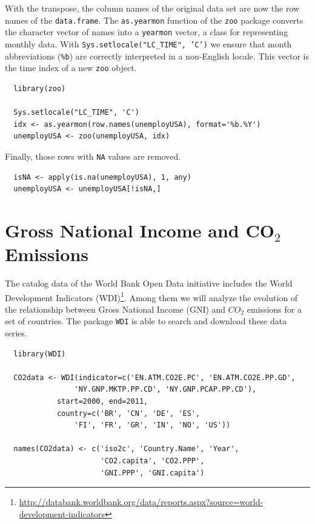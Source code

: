 With the transpose, the column names of the original data set are
now the row names of the \texttt{data.frame}. The \texttt{as.yearmon} function
of the \texttt{zoo} package converts the character vector of names into a
\texttt{yearmon} vector, a class for representing monthly data. With
\texttt{Sys.setlocale("LC\_TIME", 'C')} we ensure that month abbreviations
(\texttt{\%b}) are correctly interpreted in a non-English locale. This
vector is the time index of a new \texttt{zoo} object. 


\lstset{language=r,label= ,caption= ,captionpos=b,numbers=none}
\begin{lstlisting}
  library(zoo)
  
  Sys.setlocale("LC_TIME", 'C')
  idx <- as.yearmon(row.names(unemployUSA), format='%b.%Y')
  unemployUSA <- zoo(unemployUSA, idx)
\end{lstlisting}

Finally, those rows with \texttt{NA} values are removed.
\lstset{language=r,label= ,caption= ,captionpos=b,numbers=none}
\begin{lstlisting}
  isNA <- apply(is.na(unemployUSA), 1, any)
  unemployUSA <- unemployUSA[!isNA,]
\end{lstlisting}

\section{Gross National Income and CO\(_{\text{2}}\) Emissions}
\label{sec:org0e2c416}
The catalog data of the World Bank Open Data initiative includes the
World Development Indicators (WDI)\footnote{\url{http://databank.worldbank.org/data/reports.aspx?source=world-development-indicators}}. Among them we will analyze
the evolution of the relationship between Gross National Income (GNI)
and \(CO_2\) emissions for a set of countries. The package \texttt{WDI} is able
to search and download these data series.


\lstset{language=r,label= ,caption= ,captionpos=b,numbers=none}
\begin{lstlisting}
  library(WDI)
    
  CO2data <- WDI(indicator=c('EN.ATM.CO2E.PC', 'EN.ATM.CO2E.PP.GD',
                'NY.GNP.MKTP.PP.CD', 'NY.GNP.PCAP.PP.CD'),
            start=2000, end=2011,
            country=c('BR', 'CN', 'DE', 'ES',
                'FI', 'FR', 'GR', 'IN', 'NO', 'US'))

  names(CO2data) <- c('iso2c', 'Country.Name', 'Year',
                      'CO2.capita', 'CO2.PPP',
                      'GNI.PPP', 'GNI.capita')
\end{lstlisting}

